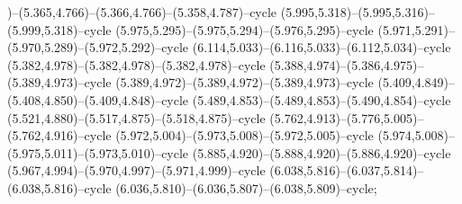 )--(5.365,4.766)--(5.366,4.766)--(5.358,4.787)--cycle (5.995,5.318)--(5.995,5.316)--(5.999,5.318)--cycle (5.975,5.295)--(5.975,5.294)--(5.976,5.295)--cycle (5.971,5.291)--(5.970,5.289)--(5.972,5.292)--cycle (6.114,5.033)--(6.116,5.033)--(6.112,5.034)--cycle (5.382,4.978)--(5.382,4.978)--(5.382,4.978)--cycle (5.388,4.974)--(5.386,4.975)--(5.389,4.973)--cycle (5.389,4.972)--(5.389,4.972)--(5.389,4.973)--cycle (5.409,4.849)--(5.408,4.850)--(5.409,4.848)--cycle (5.489,4.853)--(5.489,4.853)--(5.490,4.854)--cycle (5.521,4.880)--(5.517,4.875)--(5.518,4.875)--cycle (5.762,4.913)--(5.776,5.005)--(5.762,4.916)--cycle (5.972,5.004)--(5.973,5.008)--(5.972,5.005)--cycle (5.974,5.008)--(5.975,5.011)--(5.973,5.010)--cycle (5.885,4.920)--(5.888,4.920)--(5.886,4.920)--cycle (5.967,4.994)--(5.970,4.997)--(5.971,4.999)--cycle (6.038,5.816)--(6.037,5.814)--(6.038,5.816)--cycle (6.036,5.810)--(6.036,5.807)--(6.038,5.809)--cycle;
